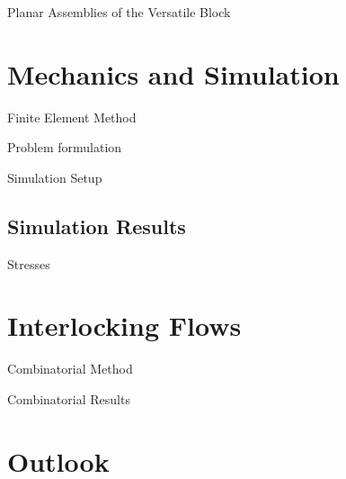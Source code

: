 \documentclass{beamer}
\numberwithin{equation}{aufgabe}
\begin{document}
\begin{frame}{Planar Assemblies of the Versatile Block}

\end{frame}

\section{Mechanics and Simulation}
\begin{frame}{Finite Element Method}
    
\end{frame}

\begin{frame}{Problem formulation}

\end{frame}

\begin{frame}{Simulation Setup}
    
\end{frame}

\subsection{Simulation Results}
\begin{frame}{Stresses}
    
\end{frame}

\section{Interlocking Flows}
\begin{frame}{Combinatorial Method}
    
\end{frame}

\begin{frame}{Combinatorial Results}
    
\end{frame}

\section{Outlook}

\begin{frame}
    
\end{frame}

\appendix
\begin{frame}    
\printbibliography 
\end{frame}
\end{document}

